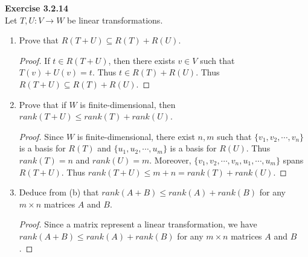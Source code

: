 \documentclass[12pt, a4paper]{article}
\theoremstyle{plain}
\newenvironment{exercise}[2][Exercise]
    { \begin{mdframed}[backgroundcolor=gray!20] \textbf{#1 #2} \\}
    {  \end{mdframed}}
\begin{document}
\pagebreak
	
\begin{exercise}{3.2.14}
Let $T,U:V\rightarrow W$ be linear transformations.
\begin{enumerate}[label=(\alph*)]
\item Prove that $R(T+U)\subseteq R(T)+R(U)$.
	\begin{proof}
	If $t\in R(T+U)$, then there exists $v\in V$ such that $T(v)+U(v)=t$. Thus $t\in R(T)+R(U)$. Thus $R(T+U)\subseteq R(T)+R(U)$.
	\end{proof}
\item Prove that if $W$ is finite-dimensional, then $rank(T+U)\leq rank(T)+rank(U)$.
	\begin{proof}
	Since $W$ is finite-dimensional, there exist $n,m$ such that $\{v_1,v_2,\cdots ,v_n\}$ is a basis for $R(T)$ and $\{u_1,u_2,\cdots ,u_m\}$ is a basis for $R(U)$. Thus $rank(T)=n$ and $rank(U)=m$. Moreover, $\{v_1,v_2,\cdots ,v_n,u_1,\cdots ,u_m\}$ spans $R(T+U)$. Thus $rank(T+U)\leq m+n = rank(T)+rank(U)$.
	\end{proof}
\item Deduce from (b) that $rank(A+B)\leq rank(A)+rank(B)$ for any $m\times n$ matrices $A$ and $B$.
	\begin{proof}
	Since a matrix represent a linear transformation, we have $rank(A+B)\leq rank(A)+rank(B)$ for any $m\times n$ matrices $A$ and $B$.
	\end{proof}
\end{enumerate}
\end{exercise}
\end{document}
